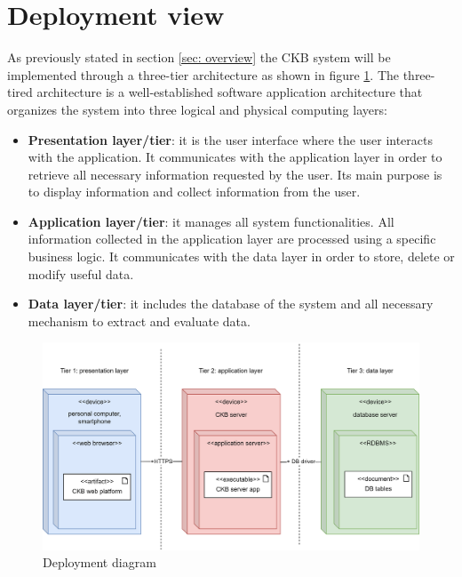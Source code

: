 \section{Deployment view}\label{sec: deployment}
As previously stated in section \ref{sec: overview} the CKB system will be implemented through a three-tier architecture as shown in figure \ref{fig:deployment}. \newline
The three-tired architecture is a well-established software application architecture that organizes the system into three logical and physical computing layers:
\begin{itemize}
    \item \textbf{Presentation layer/tier}: it is the user interface where the user interacts with the application. It communicates with the application layer in order to retrieve all necessary information requested by the user. Its main purpose is to display information and collect information from the user.
    \item \textbf{Application layer/tier}: it manages all system functionalities. All information collected in the application layer are processed using a specific business logic. It communicates with the data layer in order to store, delete or modify useful data.
    \item \textbf{Data layer/tier}: it includes the database of the system and all necessary mechanism to extract and evaluate data.
\end{itemize}
\begin{figure}[h]
    \centering 
    \includegraphics[scale=0.8]{images/deployment.png}
    \caption{Deployment diagram}
    \label{fig:deployment}
\end{figure}
\clearpage

